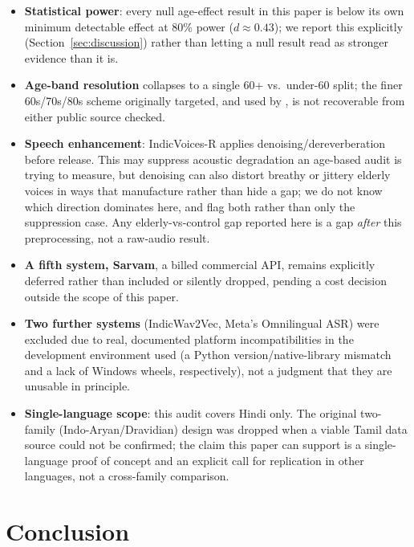 \documentclass[11pt]{article}
\begin{document}
\begin{itemize}
pools across all four systems, though the elderly/control ratio is held constant within each pool.
\item \textbf{Statistical power}: every null age-effect result in this paper is below its own
minimum detectable effect at 80\% power ($d \approx 0.43$); we report this explicitly
(Section~\ref{sec:discussion}) rather than letting a null result read as stronger evidence than it
is.
\item \textbf{Age-band resolution} collapses to a single 60+ vs.\ under-60 split; the finer
60s/70s/80s scheme originally targeted, and used by \citet{pellegrini2012impact}, is not
recoverable from either public source checked.
\item \textbf{Speech enhancement}: IndicVoices-R applies denoising/dereverberation before release.
This may suppress acoustic degradation an age-based audit is trying to measure, but denoising can
also distort breathy or jittery elderly voices in ways that manufacture rather than hide a gap; we
do not know which direction dominates here, and flag both rather than only the suppression case.
Any elderly-vs-control gap reported here is a gap \emph{after} this preprocessing, not a raw-audio
result.
\item \textbf{A fifth system, Sarvam}, a billed commercial API, remains explicitly deferred rather
than included or silently dropped, pending a cost decision outside the scope of this paper.
\item \textbf{Two further systems} (IndicWav2Vec, Meta's Omnilingual ASR) were excluded due to
real, documented platform incompatibilities in the development environment used (a Python
version/native-library mismatch and a lack of Windows wheels, respectively), not a judgment that
they are unusable in principle.
\item \textbf{Single-language scope}: this audit covers Hindi only. The original two-family
(Indo-Aryan/Dravidian) design was dropped when a viable Tamil data source could not be confirmed;
the claim this paper can support is a single-language proof of concept and an explicit call for
replication in other languages, not a cross-family comparison.
\end{itemize}

\section{Conclusion}
\end{document}
